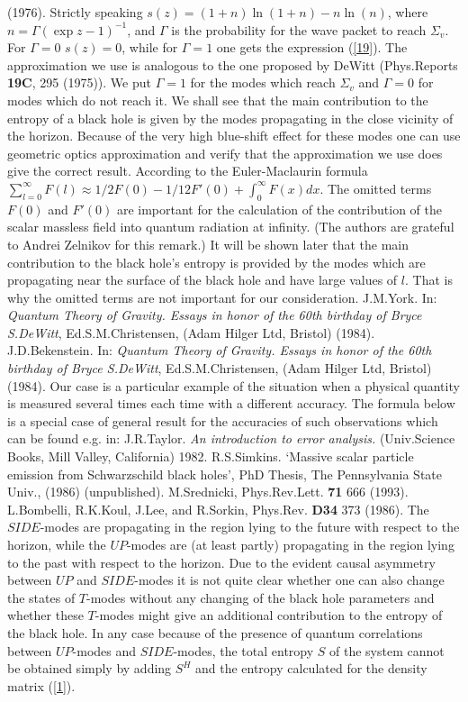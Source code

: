 \documentclass[superscriptaddress,showpacs,preprintnumbers,amsmath,amssymb,
nofootinbib,aps,prd,12pt]{revtex4-1}
\begin{document}
\begin{thebibliography}{99}
(1976).
 Strictly speaking $s(z) =(1+n)\ln (1+n)-n\ln (n)$,
where $n=\Gamma (\exp z -1)^{-1}$, and $\Gamma$ is the probability
for the wave packet to reach $\Sigma_v$. For $\Gamma =0$ $s(z)=0$,
while for $\Gamma =1$ one gets the expression (\ref{19}). The approximation
we use is analogous to the one proposed by DeWitt
(Phys.Reports {\bf 19C}, 295 (1975)). We put $\Gamma =1$ for the modes
which reach $\Sigma_v$ and $\Gamma =0$ for modes which do not reach it.
We shall see that the main contribution to the entropy of a black hole
is given by the modes propagating in the close vicinity of the horizon.
Because of the very high blue-shift effect for these modes one can
use geometric optics approximation and verify that the approximation
we use does give the correct result.
 According to the Euler-Maclaurin formula
$\sum_{l=0}^{\infty}F(l)\approx 1/2 F(0)-1/12 F'(0) +\int_0^{\infty}
F(x)dx$. The omitted terms $F(0)$ and $F'(0)$ are important for the
calculation
of the contribution of the scalar massless field into quantum radiation at
infinity.
(The authors are grateful to Andrei Zelnikov for this remark.) It will be
shown
later
that the main contribution to the black hole's entropy is provided by the
modes
which are propagating near the surface of the black hole and have large values
of $l$. That is why the omitted terms are not important for our consideration.
 J.M.York. In: {\em Quantum Theory of Gravity.
Essays in honor of the 60th birthday of Bryce S.DeWitt},
Ed.S.M.Christensen, (Adam Hilger Ltd, Bristol) (1984).
 J.D.Bekenstein. In: {\em Quantum Theory of Gravity.
Essays in honor of the 60th birthday of Bryce S.DeWitt},
Ed.S.M.Christensen, (Adam Hilger Ltd, Bristol) (1984).
 Our case is a particular example of the situation
when a physical quantity is measured several times each time
with a different accuracy. The formula below is a special case
of general result for the accuracies of such observations which
can be found e.g. in:  J.R.Taylor. {\em An introduction to error analysis.}
(Univ.Science Books, Mill Valley, California) 1982.
 R.S.Simkins. `Massive scalar particle emission
from Schwarzschild black holes', PhD Thesis, The Pennsylvania State Univ.,
(1986) (unpublished).
 M.Srednicki, Phys.Rev.Lett. {\bf 71} 666 (1993).
 L.Bombelli, R.K.Koul, J.Lee, and R.Sorkin,
Phys.Rev. {\bf D34} 373 (1986).
 The $SIDE$-modes are propagating in the region lying to
the future with respect to the horizon, while the $UP$-modes are (at least
partly)
propagating in the region lying to the past with respect to the horizon.
Due to the evident causal asymmetry between $UP$ and $SIDE$-modes
it is not quite clear whether one can also change the states of $T$-modes
without any changing of the black hole parameters and whether
these $T$-modes might give an additional contribution to the entropy of
the black hole. In any case because of the presence of quantum correlations
between $UP$-modes  and $SIDE$-modes, the total entropy $S$ of the system
cannot
be obtained simply by adding $S^H$ and the entropy calculated for the density
matrix (\ref{1}).

\end{thebibliography}
\end{document}
